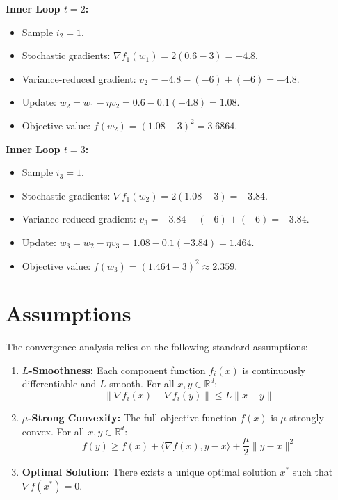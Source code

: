 \documentclass[11pt]{article}
\begin{document}
\textbf{Inner Loop $t=2$:}
\begin{itemize}
    \item Sample $i_2 = 1$.
    \item Stochastic gradients: $\nabla f_1(w_1) = 2(0.6-3) = -4.8$.
    \item Variance-reduced gradient: $v_2 = -4.8 - (-6) + (-6) = -4.8$.
    \item Update: $w_2 = w_1 - \eta v_2 = 0.6 - 0.1(-4.8) = 1.08$.
    \item Objective value: $f(w_2) = (1.08 - 3)^2 = 3.6864$.
\end{itemize}

\textbf{Inner Loop $t=3$:}
\begin{itemize}
    \item Sample $i_3 = 1$.
    \item Stochastic gradients: $\nabla f_1(w_2) = 2(1.08-3) = -3.84$.
    \item Variance-reduced gradient: $v_3 = -3.84 - (-6) + (-6) = -3.84$.
    \item Update: $w_3 = w_2 - \eta v_3 = 1.08 - 0.1(-3.84) = 1.464$.
    \item Objective value: $f(w_3) = (1.464 - 3)^2 \approx 2.359$.
\end{itemize}

\section*{Assumptions}
The convergence analysis relies on the following standard assumptions:
\begin{enumerate}
    \item \textbf{$L$-Smoothness:} Each component function $f_i(x)$ is continuously differentiable and $L$-smooth. For all $x, y \in \mathbb{R}^d$:
    \begin{equation}
        \|\nabla f_i(x) - \nabla f_i(y)\| \leq L \|x - y\|
    \end{equation}
    \item \textbf{$\mu$-Strong Convexity:} The full objective function $f(x)$ is $\mu$-strongly convex. For all $x, y \in \mathbb{R}^d$:
    \begin{equation}
        f(y) \geq f(x) + \langle \nabla f(x), y - x \rangle + \frac{\mu}{2} \|y - x\|^2
    \end{equation}
    \item \textbf{Optimal Solution:} There exists a unique optimal solution $x^*$ such that $\nabla f(x^*) = 0$.
\end{enumerate}
\end{document}
